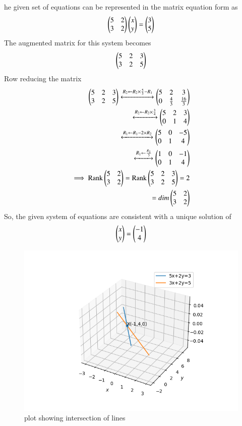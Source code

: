 he given set of equations can be represented in the matrix equation form as 
\begin{align}
\begin{pmatrix}5&2\\3&2\end{pmatrix}\begin{pmatrix}x\\y\end{pmatrix}=\begin{pmatrix}3\\5\end{pmatrix}
\end{align}
The augmented matrix for this system becomes
\begin{align}
    \begin{pmatrix}5&2&3\\3&2&5\end{pmatrix}
\end{align}
Row reducing the matrix
\begin{align}
   \begin{pmatrix}5&2&3\\3&2&5\end{pmatrix}\xleftrightarrow[]{R_2\leftarrow R_2\times\frac{5}{3}-R_1}\begin{pmatrix}5&2&3\\0&\frac{4}{3}&\frac{16}{3}\end{pmatrix}\\
    \xleftrightarrow[]{R_2\leftarrow R_2\times\frac{3}{4}}\begin{pmatrix}5&2&3\\0&1&4\end{pmatrix}\\
    \xleftrightarrow[]{R_1\leftarrow R_1-2\times R_2}\begin{pmatrix}5&0&-5\\0&1&4\end{pmatrix}\\
    \xleftrightarrow[]{R_1\leftarrow \frac{R_1}{5}}\begin{pmatrix}1&0&-1\\0&1&4\end{pmatrix}\\
      \implies\text{Rank}\begin{pmatrix}5&2\\3&2\end{pmatrix}=\text{Rank}\begin{pmatrix}5&2&3\\3&2&5\end{pmatrix}=2\\=dim\begin{pmatrix}5&2\\3&2\end{pmatrix}   
    \end{align}
So, the given system of equations are consistent with a unique solution of
\begin{align}
 \begin{pmatrix}x\\y\end{pmatrix}=\begin{pmatrix}-1\\4\end{pmatrix}   
\end{align}
\begin{figure}[!ht]
\centering
\includegraphics[width=\columnwidth]{./solutions/det/61/plot.png}
\caption{plot showing intersection of lines}
\label{Fig}
\end{figure}

